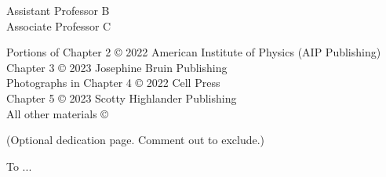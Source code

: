 




\othercommitteemembers
{
  Assistant Professor B\\
  Associate Professor C
}



\copyrightdeclaration
{
    Portions of Chapter 2 {\copyright} 2022 American Institute of Physics (AIP Publishing) \\
    Chapter 3 {\copyright} 2023 Josephine Bruin Publishing \\
    Photographs in Chapter 4 {\copyright} 2022 Cell Press \\
    Chapter 5  {\copyright} 2023 Scotty Highlander Publishing \\
    
    All other materials {\copyright} {\Degreeyear} \Authorname
}



\dedications
{
  (Optional dedication page. Comment out to exclude.)
  
  To ...
}

